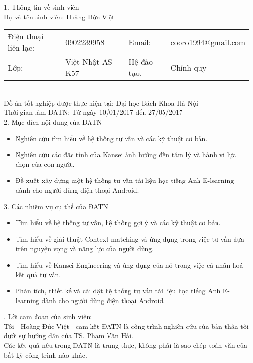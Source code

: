  
 
\begin{acknowledgementslong}      
1. Thông tin về sinh viên\\
Họ và tên sinh viên: Hoàng Đức Việt\\
\begin{tabular}{@{}l l l l}
Điện thoại liên lạc: & 0902239958 & Email: & cooro1994@gmail.com \\ 
Lớp: & Việt Nhật AS K57 & Hệ đào tạo:  & Chính quy
\end{tabular}\\
Đồ án tốt nghiệp được thực hiện tại: Đại học Bách Khoa Hà Nội\\
Thời gian làm ĐATN: Từ ngày \textbf{ }10/01/2017\textbf{ } đến \textbf{ }27/05/2017\textbf{ }\\[0.5cm]
2. Mục đích nội dung của ĐATN 
\begin{itemize}
\item Nghiên cứu tìm hiểu về hệ thống tư vấn và các kỹ thuật cơ bản.  
\item Nghiên cứu các đặc tính của Kansei ảnh hưởng đến tâm lý và hành vi lựa chọn của con người.
\item Đề xuất xây dựng một hệ thống tư vấn tài liệu học tiếng Anh E-learning dành cho người dùng điện thoại Android.\\
\end{itemize}

3. Các nhiệm vụ cụ thể của ĐATN 
\begin{itemize}
\item Tìm hiểu về hệ thống tư vấn, hệ thống gợi ý và các kỹ thuật cơ bản.
\item Tìm hiểu về giải thuật Context-matching và ứng dụng trong việc tư vấn dựa trên nguyện vọng và năng lực của người dùng.
\item Tìm hiểu về Kansei Engineering và ứng dụng của nó trong việc cá nhân hoá kết quả tư vấn.
\item Phân tích, thiết kế và cài đặt hệ thống tư vấn tài liệu học tiếng Anh E-learning dành cho người dùng điện thoại Android.
\end{itemize}
. Lời cam đoan của sinh viên:\\
Tôi - Hoàng Đức Việt - cam kết ĐATN là công trình nghiên cứu của bản thân tôi dưới sự hướng dẫn của TS. Phạm Văn Hải. \\
Các kết quả nêu trong ĐATN là trung thực, không phải là sao chép toàn văn của bất kỳ công trình nào khác.\\


\end{acknowledgementslong}
